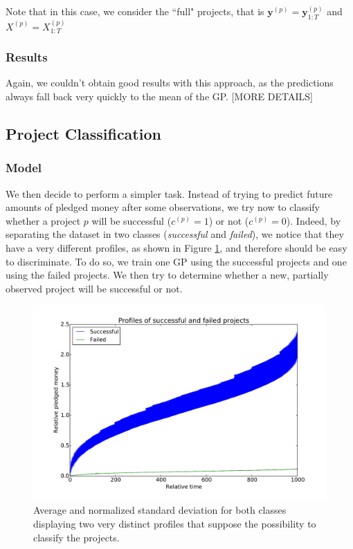 \documentclass[11pt, oneside]{article}   	%
\begin{document}
                        Note that in this case, we consider the ``full" projects, that is $\mathbf{y}^{(p)} = \mathbf{y}_{1:T}^{(p)}$ and $X^{(p)} = X_{1:T}^{(p)}$
                        
         	\subsubsection*{Results}
        			Again, we couldn't obtain good results with this approach, as the predictions always fall back very quickly to the mean of the GP. [MORE DETAILS]
        
         \subsection{Project Classification}
         	\subsubsection*{Model}
            		We then decide to perform a simpler task. Instead of trying to predict future amounts of pledged money after some observations, we try now to classify whether a project $p$ will be successful ($c^{(p)} = 1$) or not ($c^{(p)} = 0$). Indeed, by separating the dataset in two classes (\textit{successful} and \textit{failed}), we notice that they have a very different profiles, as shown in Figure \ref{fig:two_profiles}, and therefore should be easy to discriminate. To do so, we train one GP using the successful projects and one using the failed projects. We then try to determine whether a new, partially observed project will be successful or not. 
			\begin{figure}[h]
                        		\begin{center}
                        			\includegraphics[scale=0.5]{img/two_profiles.pdf}
                        			\caption{Average and normalized standard deviation for both classes displaying two very distinct profiles that suppose the possibility to classify the projects.}
                       		 	\label{fig:two_profiles}
                       	 	\end{center}
                        	\end{figure}
\end{document}
